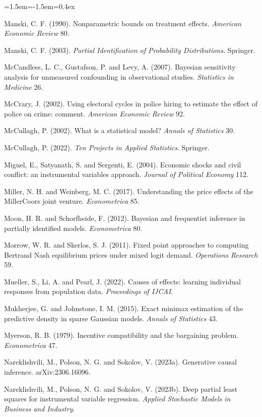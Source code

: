 \begin{list}{}{\leftmargin=1.5em\itemindent=-1.5em\itemsep=0.4ex}
\item Manski, C. F. (1990). Nonparametric bounds on treatment effects. \emph{American Economic Review} 80.
\item Manski, C. F. (2003). \emph{Partial Identification of Probability Distributions}. Springer.
\item McCandless, L. C., Gustafson, P. and Levy, A. (2007). Bayesian sensitivity analysis for unmeasured confounding in observational studies. \emph{Statistics in Medicine} 26.
\item McCrary, J. (2002). Using electoral cycles in police hiring to estimate the effect of police on crime: comment. \emph{American Economic Review} 92.
\item McCullagh, P. (2002). What is a statistical model? \emph{Annals of Statistics} 30.
\item McCullagh, P. (2022). \emph{Ten Projects in Applied Statistics}. Springer.
\item Miguel, E., Satyanath, S. and Sergenti, E. (2004). Economic shocks and civil conflict: an instrumental variables approach. \emph{Journal of Political Economy} 112.
\item Miller, N. H. and Weinberg, M. C. (2017). Understanding the price effects of the MillerCoors joint venture. \emph{Econometrica} 85.
\item Moon, H. R. and Schorfheide, F. (2012). Bayesian and frequentist inference in partially identified models. \emph{Econometrica} 80.
\item Morrow, W. R. and Skerlos, S. J. (2011). Fixed point approaches to computing Bertrand Nash equilibrium prices under mixed logit demand. \emph{Operations Research} 59.
\item Mueller, S., Li, A. and Pearl, J. (2022). Causes of effects: learning individual responses from population data. \emph{Proceedings of IJCAI}.
\item Mukherjee, G. and Johnstone, I. M. (2015). Exact minimax estimation of the predictive density in sparse Gaussian models. \emph{Annals of Statistics} 43.
\item Myerson, R. B. (1979). Incentive compatibility and the bargaining problem. \emph{Econometrica} 47.
\item Nareklishvili, M., Polson, N. G. and Sokolov, V. (2023a). Generative causal inference. arXiv:2306.16096.
\item Nareklishvili, M., Polson, N. G. and Sokolov, V. (2023b). Deep partial least squares for instrumental variable regression. \emph{Applied Stochastic Models in Business and Industry}.

\end{list}
